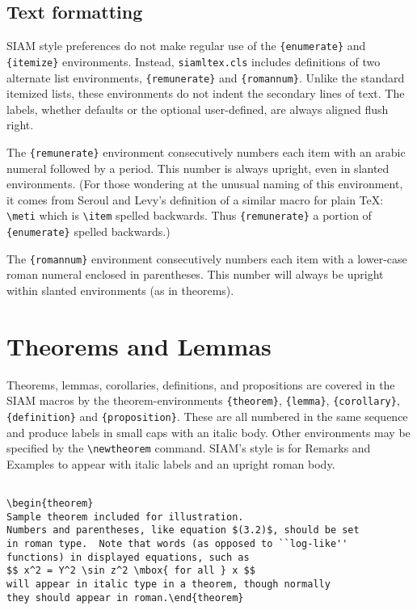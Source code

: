 \documentclass[final,leqno,onefignum,onetabnum]{siamltex1213}
\begin{document}
\subsection{Text formatting}

SIAM style preferences do not make regular use of the \verb|{enumerate}|
and \verb|{itemize}| environments. Instead,
{\tt siamltex.cls} includes definitions of two alternate list
environments, \verb|{remunerate}| and \verb|{romannum}|.
Unlike the standard itemized lists, these environments do
not indent the secondary lines of text. The labels, whether
defaults or the optional user-defined, are always aligned
flush right.

The \verb|{remunerate}| environment consecutively numbers
each item with an arabic numeral followed by a period. This
number is always upright, even in slanted
environments. (For those wondering at the unusual
naming of this environment, it comes from Seroul and Levy's
\cite{SerLev} definition of a similar macro for plain \TeX: 
\verb|\meti| which is
\protect\verb|\item|  spelled backwards. Thus
\verb|{remunerate}|
a portion of 
\verb|{enumerate}|
spelled backwards.)

The \verb|{romannum}| environment consecutively numbers
each item with a lower-case roman numeral enclosed in
parentheses. This number will always be upright within
slanted environments (as in theorems).


\section{Theorems and Lemmas}
Theorems, lemmas, corollaries, definitions, and propositions are covered
in the SIAM macros by the theorem-environments
\verb|{theorem}|, \verb|{lemma}|, \verb|{corollary}|,
\verb|{definition}| and \verb|{proposition}|. These are all
numbered in the same sequence and produce labels in small 
caps with an italic body. Other environments may be specified by the
\verb|\newtheorem| command. SIAM's style is for Remarks and Examples
to appear with italic labels and an upright roman body.

\begin{verbatim}

\begin{theorem}
Sample theorem included for illustration.  
Numbers and parentheses, like equation $(3.2)$, should be set 
in roman type.  Note that words (as opposed to ``log-like''
functions) in displayed equations, such as
$$ x^2 = Y^2 \sin z^2 \mbox{ for all } x $$
will appear in italic type in a theorem, though normally
they should appear in roman.\end{theorem}

\end{verbatim}
\end{document}
